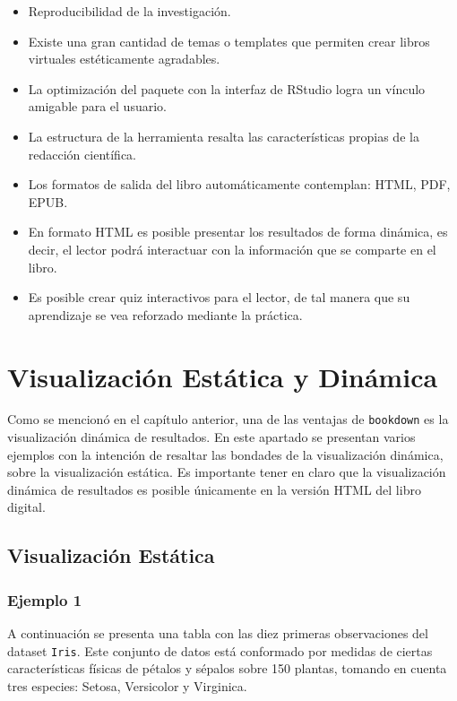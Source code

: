 \documentclass[
]{book}
\providecommand{\tightlist}{%
  \setlength{\itemsep}{0pt}\setlength{\parskip}{0pt}}
\begin{document}
\begin{itemize}
\tightlist
\item
  Reproducibilidad de la investigación.
\item
  Existe una gran cantidad de temas o templates que permiten crear libros virtuales estéticamente agradables.
\item
  La optimización del paquete con la interfaz de RStudio logra un vínculo amigable para el usuario.
\item
  La estructura de la herramienta resalta las características propias de la redacción científica.
\item
  Los formatos de salida del libro automáticamente contemplan: HTML, PDF, EPUB.
\item
  En formato HTML es posible presentar los resultados de forma dinámica, es decir, el lector podrá interactuar con la información que se comparte en el libro.
\item
  Es posible crear quiz interactivos para el lector, de tal manera que su aprendizaje se vea reforzado mediante la práctica.
\end{itemize}

\hypertarget{visualizacion}{%
\chapter{Visualización Estática y Dinámica}\label{visualizacion}}

Como se mencionó en el capítulo anterior, una de las ventajas de \texttt{bookdown} es la visualización dinámica de resultados. En este apartado se presentan varios ejemplos con la intención de resaltar las bondades de la visualización dinámica, sobre la visualización estática. Es importante tener en claro que la visualización dinámica de resultados es posible únicamente en la versión HTML del libro digital.

\hypertarget{visualizaciuxf3n-estuxe1tica}{%
\section{Visualización Estática}\label{visualizaciuxf3n-estuxe1tica}}

\hypertarget{ejemplo-1}{%
\subsection{Ejemplo 1}\label{ejemplo-1}}

A continuación se presenta una tabla con las diez primeras observaciones del dataset \texttt{Iris}. Este conjunto de datos está conformado por medidas de ciertas características físicas de pétalos y sépalos sobre 150 plantas, tomando en cuenta tres especies: Setosa, Versicolor y Virginica.
\end{document}

